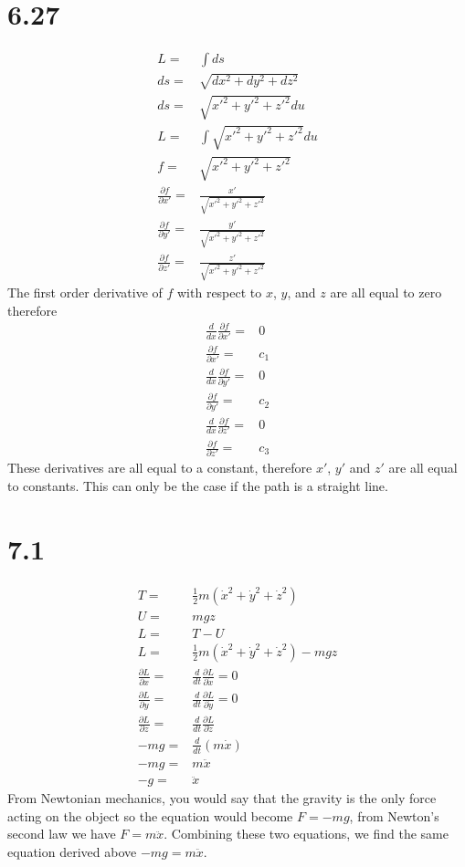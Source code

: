 \documentclass[12pt, a4paper]{article}
\begin{document}
\section{6.27}
\begin{align*}
L =& \int ds
\\
ds =& \sqrt{dx^2+dy^2+dz^2}
\\
ds =& \sqrt{x'^2 + y'^2 + z'^2} du
\\
L =& \int \sqrt{x'^2 + y'^2 + z'^2} du
\\ 
f =& \sqrt{x'^2 + y'^2 + z'^2}
\\
\frac{\partial f}{\partial x'} =& \frac{x'}{\sqrt{x'^2 + y'^2 + z'^2}}
\\
\frac{\partial f}{\partial y'} =& \frac{y'}{\sqrt{x'^2 + y'^2 + z'^2}}
\\
\frac{\partial f}{\partial z'} =& \frac{z'}{\sqrt{x'^2 + y'^2 + z'^2}}
\end{align*}
The first order derivative of $f$ with respect to $x$, $y$, and $z$ are all equal to zero therefore
\begin{align*}
\frac{d}{dx}\frac{\partial f}{\partial x'} =& 0
\\
\frac{\partial f}{\partial x'} =& c_1
\\
\frac{d}{dx}\frac{\partial f}{\partial y'} =& 0
\\
\frac{\partial f}{\partial y'} =& c_2
\\
\frac{d}{dx}\frac{\partial f}{\partial z'} =& 0
\\
\frac{\partial f}{\partial z'} =& c_3
\end{align*}
These derivatives are all equal to a constant, therefore $x'$, $y'$ and $z'$ are all equal to constants. This can only be the case if the path is a straight line. 


\pagebreak
\section{7.1}
\begin{align*}
T =& \frac{1}{2}m(\dot{x}^2+\dot{y}^2+\dot{z}^2) 
\\
U =& mgz
\\
L =& T - U
\\
L =& \frac{1}{2}m(\dot{x}^2+\dot{y}^2+\dot{z}^2) - mgz
\\
\frac{\partial L}{\partial x} =& \frac{d}{dt}\frac{\partial L}{\partial\dot{x}} = 0
\\
\frac{\partial L}{\partial y} =& \frac{d}{dt}\frac{\partial L}{\partial\dot{y}} = 0
\\
\frac{\partial L}{\partial z} =& \frac{d}{dt}\frac{\partial L}{\partial\dot{z}}
\\
-mg =& \frac{d}{dt}(m\dot{x})
\\
-mg =& m\ddot{x}
\\
-g =& \ddot{x}
\end{align*}
From Newtonian mechanics, you would say that the gravity is the only force acting on the object so the equation would become $F = -mg$, from Newton's second law we have $F = m\ddot{x}$. Combining these two equations, we find the same equation derived above $-mg = m\ddot{x}$.
\end{document}

